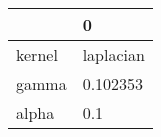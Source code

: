 \begin{tabular}{ll}
\toprule
{} &          0 \\
\midrule
kernel &  laplacian \\
gamma  &   0.102353 \\
alpha  &        0.1 \\
\bottomrule
\end{tabular}
